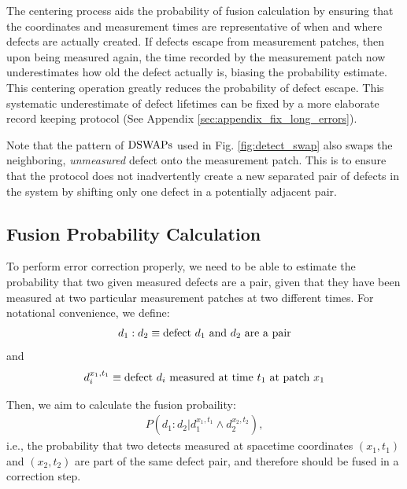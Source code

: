 \documentclass[twocolumn,superscriptaddress,aps,prb,floatfix]{revtex4-1}
\newcommand{\figref}[1]{Fig. \ref{#1}}
\begin{document}
The centering process aids the probability of fusion calculation by ensuring that the coordinates and measurement times are representative of when and where defects are actually created.  If defects escape from measurement patches, then upon being measured again, the time recorded by the measurement patch now underestimates how old the defect actually is, biasing the probability estimate.  This centering operation greatly reduces the probability of defect escape.  This systematic underestimate of defect lifetimes can be fixed by a more elaborate record keeping protocol (See Appendix \ref{sec:appendix_fix_long_errors}).

 Note that the pattern of $\rm{DSWAP}s$ used in \figref{fig:detect_swap} also swaps the neighboring, \emph{unmeasured} defect onto the measurement patch.  This is to ensure that the protocol does not inadvertently create a new separated pair of defects in the system by shifting only one defect in a potentially adjacent pair. 
 
\subsection{Fusion Probability Calculation}
\label{sec:bayes_prob_calc}


To perform error correction properly, we need to be able to estimate the probability that two given measured defects are a pair, given that they have been measured at two particular measurement patches at two different times.  For notational convenience, we define:
\begin{align}
d_1 : d_2 \equiv {\rm defect}\ d_1\ {\rm and}\ d_2\ {\rm are\ a\ pair}
\end{align}
and
\begin{align}
d_i^{x_1,t_1} \equiv {\rm defect}\ d_i\ {\rm measured\ at\ time}\ t_1\ {\rm at\ patch}\ x_1
\end{align}

Then, we aim to calculate the fusion probaility:
\begin{align}
P(d_1:d_2 | d_1^{x_1,t_1} \wedge d_2^{x_2,t_2}),
\end{align}
i.e., the probability that two detects measured at spacetime coordinates $(x_1,t_1)$ and $(x_2,t_2)$ are part of the same defect pair, and therefore should be fused in a correction step.
\end{document}
